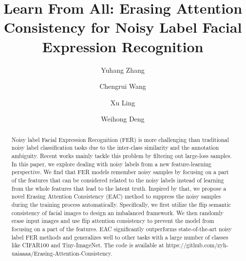\documentclass[runningheads]{llncs}
\begin{document}
\pagestyle{headings}
\mainmatter
\def\ECCVSubNumber{3977}  

\title{Learn From All: Erasing Attention Consistency for Noisy Label Facial Expression Recognition} 

\begin{comment}
\titlerunning{ECCV-22 submission ID \ECCVSubNumber} 
\authorrunning{ECCV-22 submission ID \ECCVSubNumber} 
\author{Anonymous ECCV submission}
\institute{Paper ID \ECCVSubNumber}
\end{comment}


\author{Yuhang Zhang \and
Chengrui Wang \and
Xu Ling  \and
Weihong Deng}



\maketitle

\begin{abstract}
Noisy label Facial Expression Recognition (FER) is more challenging than traditional noisy label classification tasks due to the inter-class similarity and the annotation ambiguity. Recent works mainly tackle this problem by filtering out large-loss samples. In this paper, we explore dealing with noisy labels from a new feature-learning perspective. We find that FER models remember noisy samples by focusing on a part of the features that can be considered related to the noisy labels instead of learning from the whole features that lead to the latent truth. Inspired by that, we propose a novel Erasing Attention Consistency (EAC) method to suppress the noisy samples during the training process automatically. Specifically, we first utilize the flip semantic consistency of facial images to design an imbalanced framework. We then randomly erase input images and use flip attention consistency to prevent the model from focusing on a part of the features. EAC significantly outperforms state-of-the-art noisy label FER methods and generalizes well to other tasks with a large number of classes like CIFAR100 and Tiny-ImageNet. The code is available at https://github.com/zyh-uaiaaaa/Erasing-Attention-Consistency.


\end{abstract}
\end{document}
